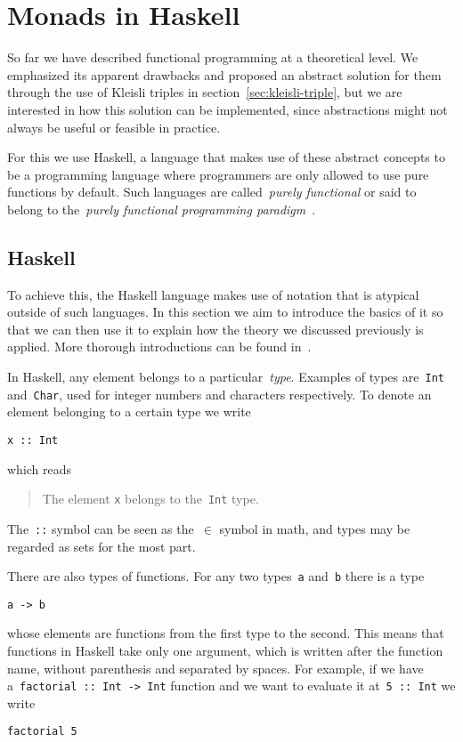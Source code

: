 \documentclass[a4paper]{article}
\theoremstyle{plain}
\theoremstyle{definition}
\begin{document}
\section{Monads in Haskell}
So far we have described functional programming at a theoretical level. We
emphasized its apparent drawbacks and proposed an abstract solution for them
through the use of Kleisli triples in section~\ref{sec:kleisli-triple}, but we
are interested in how this solution can be implemented, since abstractions might
not always be useful or feasible in practice.

For this we use Haskell, a language that makes use of these abstract concepts to
be a programming language where programmers are only allowed to use pure
functions by default. Such languages are called~\emph{purely functional} or said
to belong to the~\emph{purely functional programming
paradigm}~\cite{paradigms-overview}.

\subsection{Haskell}
To achieve this, the Haskell language makes use of notation that is atypical
outside of such languages. In this section we aim to introduce the basics of it
so that we can then use it to explain how the theory we discussed previously is
applied. More thorough introductions can be found in~\cite{haskell-org-docs}.

In Haskell, any element belongs to a particular~\emph{type}. Examples of types
are~\texttt{Int} and~\texttt{Char}, used for integer
numbers and characters respectively. To denote an element belonging to a certain
type we write
\begin{verbatim}
x :: Int
\end{verbatim}
which reads
\begin{quote}
    The element \texttt{x} belongs to the~\texttt{Int}
    type.
\end{quote}
The~\texttt{::} symbol can be seen as the~\(\in\) symbol in math,
and types may be regarded as sets for the most part.

There are also types of functions. For any two types~\texttt{a}
and~\texttt{b} there is a type
\begin{verbatim}
a -> b
\end{verbatim}
whose elements are functions from the first type to the second. This means that
functions in Haskell take only one argument, which is written after the function
name, without parenthesis and separated by spaces. For example, if we have
a~\texttt{factorial :: Int -> Int} function and we want to evaluate
it at~\texttt{5 :: Int} we write
\begin{verbatim}
factorial 5
\end{verbatim}
\end{document}
